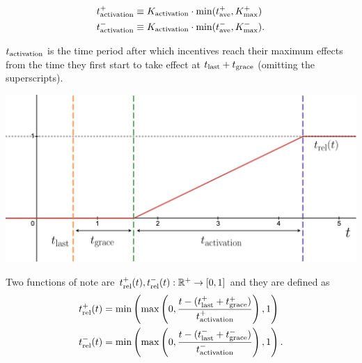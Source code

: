 \documentclass[9pt,oneside]{amsart}
\newenvironment{Figure}
  {\par\medskip\noindent\minipage{\linewidth}}
  {\endminipage\par\medskip}
\begin{document}
\begin{multicols}{2}
\begin{align}
t^+_\textnormal{activation} &\equiv 
 K_\textnormal{activation} \cdot \min(t^+_\textnormal{ave}, K^+_\textnormal{max})\\
t^-_\textnormal{activation} &\equiv 
 K_\textnormal{activation} \cdot \min(t^-_\textnormal{ave}, K^-_\textnormal{max}).
\end{align}

$t_\textnormal{activation}$ is the time period after which incentives reach their maximum effects from the time they first start to take effect at $t_\textnormal{last}+t_\textnormal{grace}$ (omitting the superscripts). 
\begin{Figure}
 \centering
\includegraphics[width=0.9\linewidth]{fig/relative_time_graph.png}
 \vspace{-0.1in}
\label{fig:relativetime}
\end{Figure}

Two functions of note are $t^+_\textnormal{rel}(t),t^-_\textnormal{rel}(t): \mathbb{R}^+ \rightarrow [0,1]$ and they are defined as
\begin{align}
t_\textnormal{rel}^+(t) &=  
\textnormal{min}\left(\textnormal{max}\left(0, \frac{t - (t^+_\textnormal{last} + t^+_\textnormal{grace})}{t^+_\textnormal{activation}}\right), 1\right)\\
t_\textnormal{rel}^-(t) &=  
\textnormal{min}\left(\textnormal{max}\left(0, \frac{t - (t^-_\textnormal{last} + t^-_\textnormal{grace})}{t^-_\textnormal{activation}}\right), 1\right)
.
\end{align}


\end{multicols}
\end{document}
